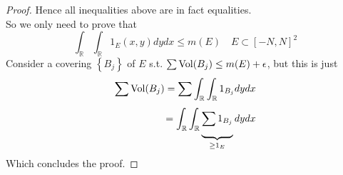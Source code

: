 \documentclass[../main.tex]{subfiles}
\begin{document}
\begin{proof}
Hence all inequalities above are in fact equalities.\\
So we only need to prove that
\[ 
\int_{ \mathbb{R} }^{  } \int_{ \mathbb{R} }^{  } 1_E ( x,y) dy dx \leq  m( E) \quad E \subset [ -N,N] ^{2}
\]
Consider a covering $ \left\{ B_j \right\} $ of $E$ s.t. $\sum \operatorname{Vol}( B_j) \leq  m( E)+\epsilon $, but this is just
\begin{align*}
\sum_{}^{ }\operatorname{Vol} ( B_j) = \sum_{}^{ } \int_\mathbb{R} \int_\mathbb{R} 1_{B_j} dydx\\
= \int_{ \mathbb{R} }^{  } \int_{ \mathbb{R} }^{  } \underbrace{\sum_{}^{ }1_{ B_j } }_{ \geq 1_E}dy dx
\end{align*}
Which concludes the proof.
	

										
\end{proof}
\end{document}
